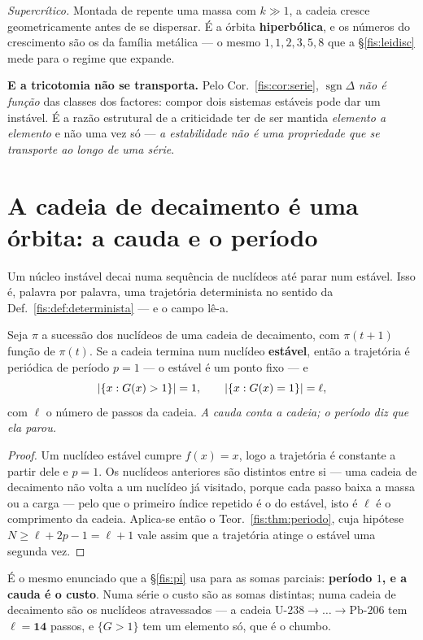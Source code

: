 \documentclass[livro.tex]{subfiles}
\begin{document}
\medskip\noindent\emph{Supercrítico.} Montada de repente uma massa com
$k\gg1$, a cadeia cresce geometricamente antes de se dispersar. É a órbita
\textbf{hiperbólica}, e os números do crescimento são os da família metálica ---
o mesmo $1,1,2,3,5,8$ que a §\ref{fis:leidisc} mede para o regime que expande.

\medskip\noindent\textbf{E a tricotomia não se transporta.} Pelo
Cor.~\ref{fis:cor:serie}, $\operatorname{sgn}\Delta$ \emph{não é função} das
classes dos factores: compor dois sistemas estáveis pode dar um instável. É a
razão estrutural de a criticidade ter de ser mantida \emph{elemento a elemento} e
não uma vez só --- \emph{a estabilidade não é uma propriedade que se transporte ao
longo de uma série}.

\section{A cadeia de decaimento é uma órbita: a cauda e o período}\label{fis:cadeia}

\noindent Um núcleo instável decai numa sequência de nuclídeos até parar num
estável. Isso é, palavra por palavra, uma trajetória determinista no sentido da
Def.~\ref{fis:def:determinista} --- e o campo lê-a.

\begin{teorema}\label{fis:thm:cadeia}
Seja $\pi$ a sucessão dos nuclídeos de uma cadeia de decaimento, com $\pi(t+1)$
função de $\pi(t)$. Se a cadeia termina num nuclídeo \textbf{estável}, então a
trajetória é periódica de período $p=1$ --- o estável é um ponto fixo --- e
\[
\lvert \{x:G(x)>1\}\rvert=1,\qquad \lvert \{x:G(x)=1\}\rvert=\ell ,
\]
com $\ell$ o número de passos da cadeia. \emph{A cauda conta a cadeia; o período
diz que ela parou.}
\end{teorema}

\begin{proof}
Um nuclídeo estável cumpre $f(x)=x$, logo a trajetória é constante a partir dele
e $p=1$. Os nuclídeos anteriores são distintos entre si --- uma cadeia de
decaimento não volta a um nuclídeo já visitado, porque cada passo baixa a massa
ou a carga --- pelo que o primeiro índice repetido é o do estável, isto é
$\ell$ é o comprimento da cadeia. Aplica-se então o Teor.~\ref{fis:thm:periodo},
cuja hipótese $N\ge\ell+2p-1=\ell+1$ vale assim que a trajetória atinge o estável
uma segunda vez.
\end{proof}

\medskip\noindent É o mesmo enunciado que a §\ref{fis:pi} usa para as somas
parciais: \textbf{período $1$, e a cauda é o custo}. Numa série o custo são as
somas distintas; numa cadeia de decaimento são os nuclídeos atravessados --- a
cadeia $\mathrm{U}\text{-}238\to\dots\to\mathrm{Pb}\text{-}206$ tem
$\ell=\mathbf{14}$ passos, e $\{G>1\}$ tem um elemento só, que é o chumbo.
\end{document}
